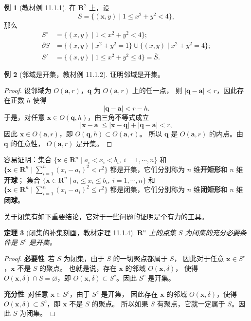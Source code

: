 \documentclass[11pt]{ctexart}
\theoremstyle{plain}
\newtheorem{thm}{定理}[section]
\theoremstyle{definition}
\newtheorem{ex}[thm]{例}
\theoremstyle{remark}
\begin{document}
\begin{ex}[教材例 11.1.1]\label{ex:annulus}
在 \(\mathbf{R}^2\) 上，设
\[
  S=\{(\boldsymbol{x},y)\mid 1\le x^2+y^2<4\},
\]
那么
\begin{align*}
  S^\circ&=\{(x,y)\mid 1<x^2+y^2<4\};\\
  \partial S&=\{(x,y)\mid x^2+y^2=1\}\cup\{(x,y)\mid x^2+y^2=4\};\\
  S'&=\{(x,y)\mid 1\le x^2+y^2\le 4\}=\overline{S}.
\end{align*}
\end{ex}

\begin{ex}[邻域是开集，教材例 11.1.2]\label{ex:nbhdopen}
证明邻域是开集。
\end{ex}

\begin{proof}
设邻域为 \(O(\boldsymbol{a},r)\)，\(\boldsymbol{q}\) 为 \(O(\boldsymbol{a},r)\) 上的任一点，
则 \(|\boldsymbol{q}-\boldsymbol{a}|<r\)，因此存在正数 \(h\) 使得
\[
  |\boldsymbol{q}-\boldsymbol{a}|<r-h .
\]
于是，对任意 \(\boldsymbol{x}\in O(\boldsymbol{q},h)\)，由三角不等式成立
\[
  |\boldsymbol{x}-\boldsymbol{a}|\le|\boldsymbol{x}-\boldsymbol{q}|+|\boldsymbol{q}-\boldsymbol{a}|<r,
\]
因此 \(\boldsymbol{x}\in O(\boldsymbol{a},r)\)，即 \(O(\boldsymbol{q},h)\subset O(\boldsymbol{a},r)\)。
所以 \(\boldsymbol{q}\) 是 \(O(\boldsymbol{a},r)\) 的内点。由 \(\boldsymbol{q}\) 的任意性，
\(O(\boldsymbol{a},r)\) 是开集。
\end{proof}

容易证明：集合
\(\{\boldsymbol{x}\in\mathbf{R}^n\mid a_i<x_i<b_i,\ i=1,\cdots,n\}\) 和
\(\{\boldsymbol{x}\in\mathbf{R}^n\mid \sum_{i=1}^{n}(x_i-a_i)^2<r^2\}\)
都是开集，它们分别称为 \(n\) 维\textbf{开矩形}和 \(n\) 维\textbf{开球}；
集合
\(\{\boldsymbol{x}\in\mathbf{R}^n\mid a_i\le x_i\le b_i,\ i=1,\cdots,n\}\) 和
\(\{\boldsymbol{x}\in\mathbf{R}^n\mid \sum_{i=1}^{n}(x_i-a_i)^2\le r^2\}\)
都是闭集，它们分别称为 \(n\) 维\textbf{闭矩形}和 \(n\) 维\textbf{闭球}。

关于闭集有如下重要结论，它对于一些问题的证明是个有力的工具。

\begin{thm}[闭集的补集刻画，教材定理 11.1.4]\label{thm:closed}
\(\mathbf{R}^n\) 上的点集 \(S\) 为闭集的充分必要条件是 \(S^c\) 是开集。
\end{thm}

\begin{proof}
\textbf{必要性}\ 若 \(S\) 为闭集，由于 \(S\) 的一切聚点都属于 \(S\)，
因此对于任意 \(\boldsymbol{x}\in S^c\)，\(\boldsymbol{x}\) 不是 \(S\) 的聚点。
也就是说，存在 \(\boldsymbol{x}\) 的邻域 \(O(\boldsymbol{x},\delta)\)，
使得 \(O(\boldsymbol{x},\delta)\cap S=\varnothing\)，即
\(O(\boldsymbol{x},\delta)\subset S^c\)。因此 \(S^c\) 是开集。

\textbf{充分性}\ 对任意 \(\boldsymbol{x}\in S^c\)，由于 \(S^c\) 是开集，
因此存在 \(\boldsymbol{x}\) 的邻域 \(O(\boldsymbol{x},\delta)\)，使得
\(O(\boldsymbol{x},\delta)\subset S^c\)，即 \(\boldsymbol{x}\) 不是 \(S\) 的聚点。
所以如果 \(S\) 有聚点，它就一定属于 \(S\)。因此 \(S\) 为闭集。
\end{proof}
\end{document}
